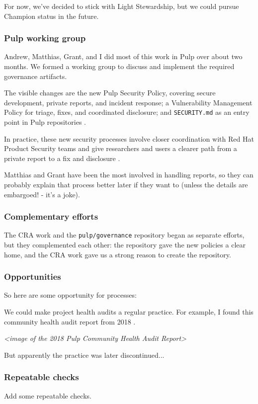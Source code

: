 \documentclass[11pt]{article}
\newcommand{\nextslide}{%
  \par\smallskip\noindent\fbox{\textsf{\small Switch slides}}\par\smallskip
}
\newcommand{\draftimage}[1]{%
  \par\medskip\noindent\emph{\textless image of #1\textgreater}\par\medskip
}
\begin{document}
For now, we've decided to stick with Light Stewardship, but we could pursue Champion status in the future.

\subsubsection{Pulp working group}
Andrew, Matthias, Grant, and I did most of this work in Pulp over about two months.
We formed a working group to discuss and implement the required governance artifacts.

The visible changes are the new Pulp Security Policy, covering secure development,
private reports, and incident response; a Vulnerability Management Policy for
triage, fixes, and coordinated disclosure; and \texttt{SECURITY.md} as an entry point
in Pulp repositories \cite{pulp-cra-announcement,pulp-security-policy,pulp-vulnerability-management}.

In practice, these new security processes involve closer coordination with Red Hat Product Security
teams and give researchers and users a clearer path from a private report to a fix and disclosure
\cite{redhat-cra-steward}.

Matthias and Grant have been the most involved in handling reports, so they can probably explain
that process better later if they want to (unless the details are embargoed! - it's a joke).

\subsubsection{Complementary efforts}
The CRA work and the \texttt{pulp/governance} repository began as separate efforts, but they complemented each other:
the repository gave the new policies a clear home, and the CRA work gave us a strong reason
to create the repository.

\subsubsection{Opportunities}
So here are some opportunity for processes:

We could make project health audits a regular practice.
For example, I found this community health audit report from 2018 \cite{pulp-health-audit}.

\nextslide
\draftimage{the 2018 Pulp Community Health Audit Report}
But apparently the practice was later discontinued...

\nextslide
\subsubsection{Repeatable checks}
Add some repeatable checks.
\end{document}
